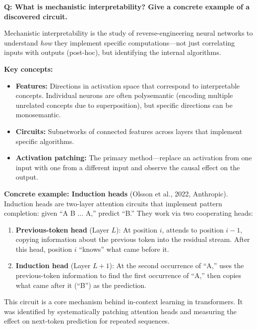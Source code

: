 
\begin{interviewq}
\textbf{Q: What is mechanistic interpretability? Give a concrete example of a discovered circuit.}

 \quad {} \quad \badgefreq{\freqmed}

\stronganswer

Mechanistic interpretability is the study of reverse-engineering neural networks to understand \textit{how} they implement specific computations---not just correlating inputs with outputs (post-hoc), but identifying the internal algorithms.

\textbf{Key concepts:}
\begin{itemize}
    \item \textbf{Features:} Directions in activation space that correspond to interpretable concepts. Individual neurons are often polysemantic (encoding multiple unrelated concepts due to superposition), but specific directions can be monosemantic.
    \item \textbf{Circuits:} Subnetworks of connected features across layers that implement specific algorithms.
    \item \textbf{Activation patching:} The primary method---replace an activation from one input with one from a different input and observe the causal effect on the output.
\end{itemize}

\textbf{Concrete example: Induction heads} (Olsson et al., 2022, Anthropic). Induction heads are two-layer attention circuits that implement pattern completion: given ``A B ... A,'' predict ``B.'' They work via two cooperating heads:
\begin{enumerate}
    \item \textbf{Previous-token head} (Layer $L$): At position $i$, attends to position $i{-}1$, copying information about the previous token into the residual stream. After this head, position $i$ ``knows'' what came before it.
    \item \textbf{Induction head} (Layer $L{+}1$): At the second occurrence of ``A,'' uses the previous-token information to find the first occurrence of ``A,'' then copies what came after it (``B'') as the prediction.
\end{enumerate}
This circuit is a core mechanism behind in-context learning in transformers. It was identified by systematically patching attention heads and measuring the effect on next-token prediction for repeated sequences.


\end{interviewq}
